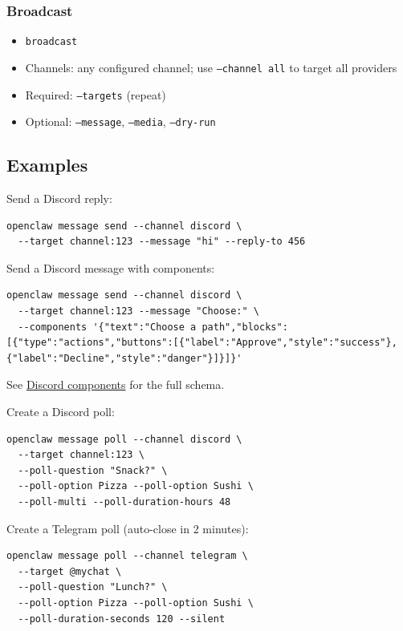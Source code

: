 \subsubsection{Broadcast}


\begin{itemize}
  \item \texttt{broadcast}
  \item Channels: any configured channel; use \texttt{--channel all} to target all providers
  \item Required: \texttt{--targets} (repeat)
  \item Optional: \texttt{--message}, \texttt{--media}, \texttt{--dry-run}
\end{itemize}


\subsection{Examples}


Send a Discord reply:

\begin{lstlisting}
openclaw message send --channel discord \
  --target channel:123 --message "hi" --reply-to 456
\end{lstlisting}


Send a Discord message with components:

\begin{lstlisting}
openclaw message send --channel discord \
  --target channel:123 --message "Choose:" \
  --components '{"text":"Choose a path","blocks":[{"type":"actions","buttons":[{"label":"Approve","style":"success"},{"label":"Decline","style":"danger"}]}]}'
\end{lstlisting}


See \href{/channels/discord\#interactive-components}{Discord components} for the full schema.

Create a Discord poll:

\begin{lstlisting}
openclaw message poll --channel discord \
  --target channel:123 \
  --poll-question "Snack?" \
  --poll-option Pizza --poll-option Sushi \
  --poll-multi --poll-duration-hours 48
\end{lstlisting}


Create a Telegram poll (auto-close in 2 minutes):

\begin{lstlisting}
openclaw message poll --channel telegram \
  --target @mychat \
  --poll-question "Lunch?" \
  --poll-option Pizza --poll-option Sushi \
  --poll-duration-seconds 120 --silent
\end{lstlisting}


